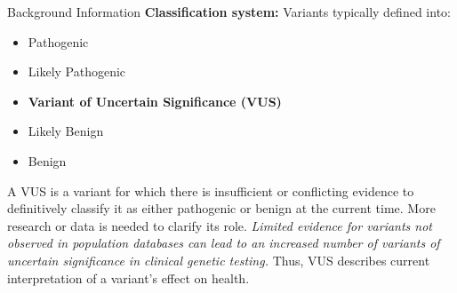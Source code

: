 \documentclass[twocolumn]{article}
\begin{document}
\begin{literaturepaper}{Background Information}
\label{background-info}
\small
\textbf{Classification system:} Variants typically defined into:
\begin{itemize}
    \item Pathogenic
    \item Likely Pathogenic
    \item \textbf{Variant of Uncertain Significance (VUS)}
    \item Likely Benign
    \item Benign
\end{itemize}
A VUS is a variant for which there is insufficient or conflicting evidence to definitively classify it as either pathogenic or benign at the current time. More research or data is needed to clarify its role. \textit{Limited evidence for variants not observed in population databases can lead to an increased number of variants of uncertain significance in clinical genetic testing.} Thus, VUS describes current interpretation of a variant's effect on health.
\end{literaturepaper} 
\end{document}
